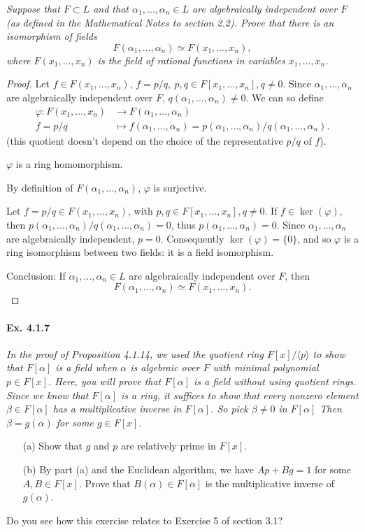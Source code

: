 \documentclass[11pt,a4paper]{article}
\begin{document}
{\it Suppose that $F\subset L$ and that $\alpha_1,\ldots,\alpha_n\in L$ are algebraically independent over $F$ (as defined in the Mathematical Notes to section 2.2). Prove that there is an isomorphism of fields
$$F(\alpha_1,\ldots,\alpha_n) \simeq F(x_1,\ldots,x_n),$$
where $F(x_1,\ldots,x_n)$ is the field of rational functions in variables $x_1,\ldots,x_n$.
}

\begin{proof}

Let $f \in F(x_1,\ldots,x_n)$, $f =p/q,\ p,q \in F[x_1,\ldots,x_n], q \neq 0$. Since $\alpha_1,\ldots,\alpha_n$ are algebraically independent over $F$, $q(\alpha_1,\ldots,\alpha_n) \neq 0$. We can so define
\begin{align*}
\varphi : F(x_1,\ldots,x_n) &\to F(\alpha_1,\ldots,\alpha_n)\\
 f = p/q  &\mapsto f(\alpha_1,\ldots,\alpha_n) = p(\alpha_1,\ldots,\alpha_n)/q(\alpha_1,\ldots,\alpha_n).
\end{align*}
(this quotient doesn't depend on the choice of the representative $p/q$ of $f$).

$\varphi$ is a ring homomorphism.

By definition of $F(\alpha_1,\ldots,\alpha_n)$, $\varphi$ is surjective.

Let $f = p/q \in F(x_1,\ldots,x_n)$, with $p,q \in F[x_1,\ldots,x_n], q\neq 0$. If $f \in \ker(\varphi)$, then $p(\alpha_1,\ldots,\alpha_n)/q(\alpha_1,\ldots,\alpha_n) =0$, thus $p(\alpha_1,\ldots,\alpha_n)=0$. Since $\alpha_1,\ldots,\alpha_n$ are algebraically independent, $p=0$. Consequently $\ker(\varphi) = \{0\}$, and so $\varphi$ is a ring isomorphism between two fields: it is a field isomorphism.

Conclusion: If $\alpha_1,\ldots,\alpha_n \in L$ are algebraically independent over $F$, then
$$F(\alpha_1,\ldots,\alpha_n) \simeq  F(x_1,\ldots,x_n).$$
\end{proof}

\paragraph{Ex. 4.1.7}

{\it In the proof of Proposition 4.1.14, we used the quotient ring $F[x]/\langle p\rangle$ to show that $F[\alpha]$ is a field when $\alpha$ is algebraic over $F$ with minimal polynomial $p \in F[x]$. Here, you will prove that $F[\alpha]$ is a field without using quotient rings. Since we know that $F[\alpha]$ is a ring, it suffices to show that every nonzero element $\beta \in F[\alpha]$ has a multiplicative inverse in $F[\alpha]$. So pick $\beta \ne 0$ in $F[\alpha]$ Then $\beta = g(\alpha)$ for some $g \in F[x]$.
\begin{enumerate}
\item[(a)] Show that $g$ and $p$ are relatively prime in $F[x]$.
\item[(b)] By part (a) and the Euclidean algorithm, we have $Ap+Bg = 1$ for some $A,B \in F[x]$. Prove that $B(\alpha) \in F[\alpha]$ is the multiplicative inverse of $g(\alpha)$.
\end{enumerate}
Do you see how this exercise relates to Exercise 5 of section 3.1?
}
\end{document}

